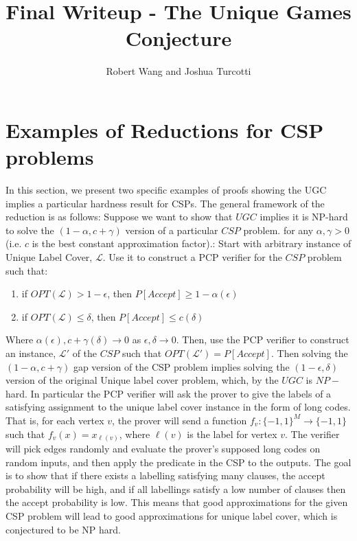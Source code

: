 \documentclass{article}
\title{Final Writeup - The Unique Games Conjecture}
\author{Robert Wang and Joshua Turcotti}
\newcommand{\1}{\mathbbm{1}}
\begin{document}
\maketitle
\section*{Examples of Reductions for CSP problems}
In this section, we present two specific examples of proofs showing the UGC implies a particular hardness result for CSPs. The general framework of the reduction is as follows: Suppose we want to show that $UGC$ implies it is NP-hard to solve the $(1-\alpha, c+\gamma)$ version of a particular $CSP$ problem. for any $\alpha, \gamma > 0$ (i.e. $c$ is the best constant approximation factor).: Start with arbitrary instance of Unique Label Cover, $\mathcal{L}$. Use it to construct a PCP verifier for the $CSP$ problem such that:
\begin{enumerate}[1)]
            \item if $OPT(\mathcal{L}) > 1-\epsilon$, then $P[Accept] \geq 1-\alpha(\epsilon)$
            \item if $OPT(\mathcal{L}) \leq \delta$, then $P[Accept] \leq c(\delta)$
\end{enumerate}
Where $\alpha(\epsilon), c+\gamma(\delta)\rightarrow 0$ as $\epsilon,\delta\rightarrow 0$. Then, use the PCP verifier to construct an instance, $\mathcal{L}'$ of the $CSP$ such that $OPT(\mathcal{L}') = P[Accept]$. Then solving the $(1-\alpha, c+\gamma)$ gap version of the CSP problem implies solving the $(1-\epsilon, \delta)$ version of the original Unique label cover problem, which, by the $UGC$ is $NP-$hard. In particular the PCP verifier will ask the prover to give the labels of a satisfying assignment to the unique label cover instance in the form of long codes. That is, for each vertex $v$, the prover will send a function $f_v:\{-1,1\}^M\rightarrow \{-1,1\}$ such that $f_v(x) = x_{\ell(v)}$, where $\ell(v)$ is the label for vertex $v$. The verifier will pick edges randomly and evaluate the prover's supposed long codes on random inputs, and then apply the predicate in the CSP to the outputs. The goal is to show that if there exists a labelling satisfying many clauses, the accept probability will be high, and if all labellings satisfy a low number of clauses then the accept probability is low. This means that good approximations for the given CSP problem will lead to good approximations for unique label cover, which is conjectured to be NP hard.
\end{document}
